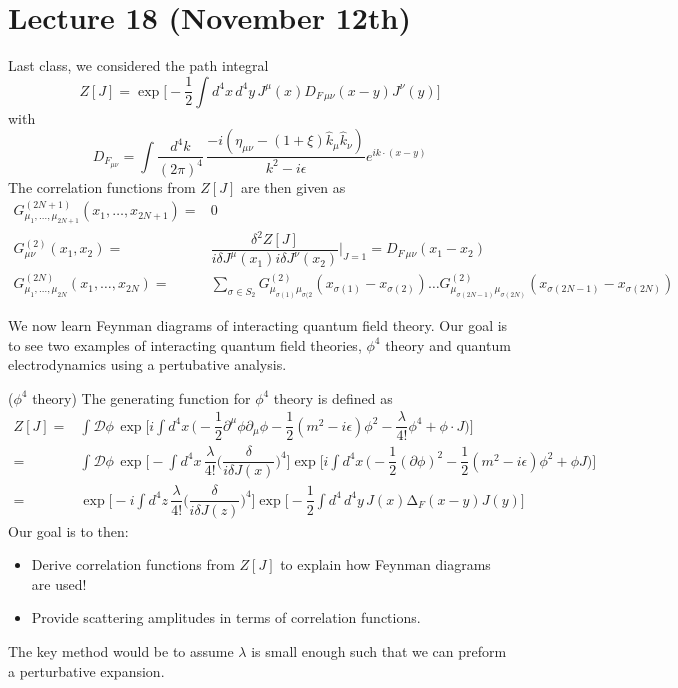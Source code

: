 \section{Lecture 18 (November 12th)}
\begin{cor}
Last class, we considered the path integral
\[Z[J]=\exp \Big[-\dfrac{1}{2}\int d^{4}x\,d^{4}y\,J^{\mu }(x)D_{F\,\mu \nu }(x-y)J^{\nu }(y)\Big]\]
with
\[D_{F_{\mu \nu }}=\int \dfrac{d^{4}k}{(2\pi )^{4}}\,\dfrac{-i(\eta _{\mu \nu }-(1+\xi )\hat{k}_{\mu }\hat{k}_{\nu })}{k^2-i\epsilon }e^{ik\cdot (x-y)}\]
The correlation functions from $Z[J]$ are then given as
\[\begin{align*}
G_{\mu_1,\ldots ,\mu _{2N+1}}^{(2N+1)}(x_1,\ldots ,x_{2N+1})=&0\\
G_{\mu \nu }^{(2)}(x_1,x_2)=&\dfrac{\delta ^2Z[J]}{i\delta J^{\mu }(x_1)i\delta J^{\nu }(x_2)}\Big|_{J=1}=D_{F\,\mu \nu }(x_1-x_2)\\
G^{(2N)}_{\mu_1,\ldots ,\mu _{2N}}(x_1,\ldots ,x_{2N})=&\sum _{\sigma \in S_{2}}G^{(2)}_{\mu _{\sigma (1)}\mu_{\sigma (2}}(x_{\sigma (1)}-x_{\sigma (2)})\ldots G_{\mu_{\sigma (2N-1)}\mu _{\sigma (2N)}}^{(2)}(x_{\sigma (2N-1)}-x_{\sigma (2N)})
\end{align*}\]
\end{cor}
\vspace{2ex}
\begin{rmk}
We now learn Feynman diagrams of interacting quantum field theory. Our goal is to see two examples of interacting quantum field theories, $\phi ^{4}$ theory and quantum electrodynamics using a pertubative analysis.
\end{rmk}
\vspace{2ex}
\begin{defi}
($\phi ^{4}$ theory) The generating function for $\phi ^{4}$ theory is defined as
\[\begin{align*}
Z[J]=&\int \mathcal{D}\phi \,\exp \Big[i\int d^{4}x\,\Big(-\dfrac{1}{2}\partial^{\mu }\phi \partial _{\mu }\phi -\dfrac{1}{2}(m^2-i\epsilon )\phi ^2-\dfrac{\lambda }{4!}\phi ^{4}+\phi \cdot J\Big)\Big]\\
=&\int \mathcal{D}\phi \,\exp \Big[-\int d^{4}x\,\dfrac{\lambda }{4!}\Big(\dfrac{\delta }{i\delta J(x)}\Big)^{4}\Big]\exp \Big[i\int d^{4}x\,\Big(-\dfrac{1}{2}(\partial \phi )^2-\dfrac{1}{2}(m^2-i\epsilon )\phi ^2+\phi J\Big)\Big]\\
=&\exp \Big[-i\int d^{4}z\,\dfrac{\lambda }{4!}\Big(\dfrac{\delta }{i\delta J(z)}\Big)^{4}\Big]\exp \Big[-\dfrac{1}{2}\int d^{4}\,d^{4}y\,J(x)\mathrm{\Delta }_{F}(x-y)J(y)\Big]
\end{align*}\]
Our goal is to then:
\begin{itemize}
\item[(i)] Derive correlation functions from $Z[J]$ to explain how Feynman diagrams are used!
\item[(ii)] Provide scattering amplitudes in terms of correlation functions. 
\end{itemize}
The key method would be to assume $\lambda $ is small enough such that we can preform a perturbative expansion.
\end{defi}
